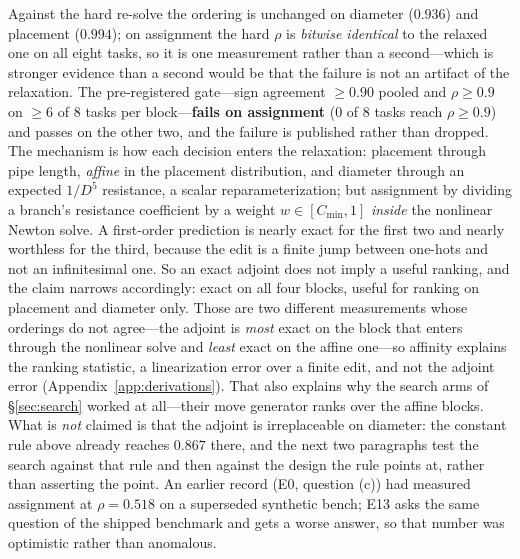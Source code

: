 \documentclass{article}
\begin{document}
Against the hard re-solve the ordering is unchanged on diameter ($0.936$) and placement
($0.994$); on assignment the hard $\rho$ is \emph{bitwise identical} to the relaxed one on
all eight tasks, so it is one measurement rather than a second---which is stronger
evidence than a second would be that the failure is not an artifact of the relaxation.
The pre-registered gate---sign agreement
$\ge 0.90$ pooled and $\rho \ge 0.9$ on $\ge 6$ of $8$ tasks per block---\textbf{fails on
assignment} ($0$ of $8$ tasks reach $\rho \ge 0.9$) and passes on the other two, and the
failure is published rather than dropped.  The mechanism is how each decision enters the
relaxation: placement through pipe length, \emph{affine} in the placement distribution,
and diameter through an expected $1/D^5$ resistance, a scalar reparameterization; but
assignment by dividing a branch's resistance coefficient by a weight
$w \in [C_{\min}, 1]$ \emph{inside} the nonlinear Newton solve.  A first-order prediction
is nearly exact for the first two and nearly worthless for the third, because the edit is
a finite jump between one-hots and not an infinitesimal one.  So an exact adjoint does not
imply a useful ranking, and the claim narrows accordingly: exact on all four blocks,
useful for ranking on placement and diameter only.  Those are two different measurements whose
orderings do not agree---the adjoint is \emph{most} exact on the block that enters through the
nonlinear solve and \emph{least} exact on the affine one---so affinity explains the ranking
statistic, a linearization error over a finite edit, and not the adjoint error
(Appendix~\ref{app:derivations}).  That also explains why the search arms
of \S\ref{sec:search} worked at all---their move generator ranks over the affine blocks.
What is \emph{not} claimed is that the adjoint is irreplaceable on diameter: the constant
rule above already reaches $0.867$ there, and the next two paragraphs test the search
against that rule and then against the design the rule points at, rather than asserting
the point.  An earlier record (E0, question (c)) had
measured assignment at $\rho = 0.518$ on a superseded synthetic bench; E13 asks the same
question of the shipped benchmark and gets a worse answer, so that number was optimistic
rather than anomalous.
\end{document}

